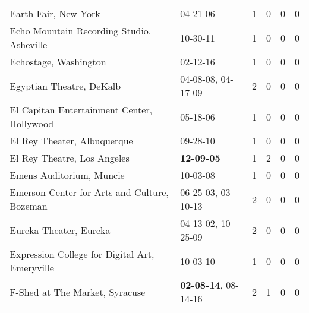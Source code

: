 \begin{longtable}{p{}p{}p{}p{}p{}p{}}
                                                         Earth Fair, New York &                                                04-21-06\textsuperscript{} &  1 &  0 &  0 &  0 \\
                                    Echo Mountain Recording Studio, Asheville &                                                10-30-11\textsuperscript{} &  1 &  0 &  0 &  0 \\
                                                        Echostage, Washington &                                                02-12-16\textsuperscript{} &  1 &  0 &  0 &  0 \\
                                                     Egyptian Theatre, DeKalb &                    04-08-08\textsuperscript{}, 04-17-09\textsuperscript{} &  2 &  0 &  0 &  0 \\
                                   El Capitan Entertainment Center, Hollywood &                                                05-18-06\textsuperscript{} &  1 &  0 &  0 &  0 \\
                                                  El Rey Theater, Albuquerque &                                                09-28-10\textsuperscript{} &  1 &  0 &  0 &  0 \\
                                                  El Rey Theatre, Los Angeles &                                       \textbf{12-09-05\textsuperscript{}} &  1 &  2 &  0 &  0 \\
                                                     Emens Auditorium, Muncie &                                                10-03-08\textsuperscript{} &  1 &  0 &  0 &  0 \\
                                 Emerson Center for Arts and Culture, Bozeman &                    06-25-03\textsuperscript{}, 03-10-13\textsuperscript{} &  2 &  0 &  0 &  0 \\
                                                       Eureka Theater, Eureka &                    04-13-02\textsuperscript{}, 10-25-09\textsuperscript{} &  2 &  0 &  0 &  0 \\
                               Expression College for Digital Art, Emeryville &                                                10-03-10\textsuperscript{} &  1 &  0 &  0 &  0 \\
                                               F-Shed at The Market, Syracuse &           \textbf{02-08-14\textsuperscript{}}, 08-14-16\textsuperscript{} &  2 &  1 &  0 &  0 \\

\end{longtable}
